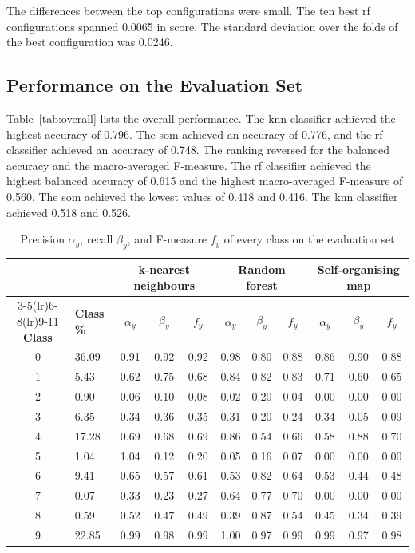 \documentclass[conference]{IEEEtran}
\begin{document}
The differences between the top configurations were small.
The ten best \gls{rf} configurations spanned 0.0065 in score.
The standard deviation over the folds of the best configuration was 0.0246.

\subsection{Performance on the Evaluation Set}
\label{sub:res_gen}

Table~\ref{tab:overall} lists the overall performance.
The \gls{knn} classifier achieved the highest accuracy of 0.796.
The \gls{som} achieved an accuracy of 0.776, and the \gls{rf} classifier achieved an accuracy of 0.748.
The ranking reversed for the balanced accuracy and the macro-averaged F-measure.
The \gls{rf} classifier achieved the highest balanced accuracy of 0.615 and the highest macro-averaged F-measure of 0.560.
The \gls{som} achieved the lowest values of 0.418 and 0.416.
The \gls{knn} classifier achieved 0.518 and 0.526.

\begin{table}[!t]
\centering
\caption{Precision $\alpha_y$, recall $\beta_y$, and F-measure $f_y$ of every class on the evaluation set}
\label{tab:perclass}
\footnotesize
\begin{tabular}{cl | ccc | ccc | ccc}
\toprule
 & & \multicolumn{3}{c}{\textbf{k-nearest neighbours}} & \multicolumn{3}{c}{\textbf{Random forest}} & \multicolumn{3}{c}{\textbf{Self-organising map}} \\
\cmidrule(lr){3-5}\cmidrule(lr){6-8}\cmidrule(lr){9-11}
\textbf{Class} & \textbf{Class \%} & $\alpha_y$ & $\beta_y$ & $f_y$ & $\alpha_y$ & $\beta_y$ & $f_y$ & $\alpha_y$ & $\beta_y$ & $f_y$ \\
\midrule
0 & 36.09 & 0.91 & 0.92 & 0.92 & 0.98 & 0.80 & 0.88 & 0.86 & 0.90 & 0.88 \\
1 & 5.43 & 0.62 & 0.75 & 0.68 & 0.84 & 0.82 & 0.83 & 0.71 & 0.60 & 0.65 \\
2 & 0.90 & 0.06 & 0.10 & 0.08 & 0.02 & 0.20 & 0.04 & 0.00 & 0.00 & 0.00 \\
3 & 6.35 & 0.34 & 0.36 & 0.35 & 0.31 & 0.20 & 0.24 & 0.34 & 0.05 & 0.09 \\
4 & 17.28 & 0.69 & 0.68 & 0.69 & 0.86 & 0.54 & 0.66 & 0.58 & 0.88 & 0.70 \\
5 & 1.04 & 1.04 & 0.12 & 0.20 & 0.05 & 0.16 & 0.07 & 0.00 & 0.00 & 0.00 \\
6 & 9.41 & 0.65 & 0.57 & 0.61 & 0.53 & 0.82 & 0.64 & 0.53 & 0.44 & 0.48 \\
7 & 0.07 & 0.33 & 0.23 & 0.27 & 0.64 & 0.77 & 0.70 & 0.00 & 0.00 & 0.00 \\
8 & 0.59 & 0.52 & 0.47 & 0.49 & 0.39 & 0.87 & 0.54 & 0.45 & 0.34 & 0.39 \\
9 & 22.85 & 0.99 & 0.98 & 0.99 & 1.00 & 0.97 & 0.99 & 0.99 & 0.97 & 0.98 \\
\bottomrule
\end{tabular}
\end{table}
\end{document}
